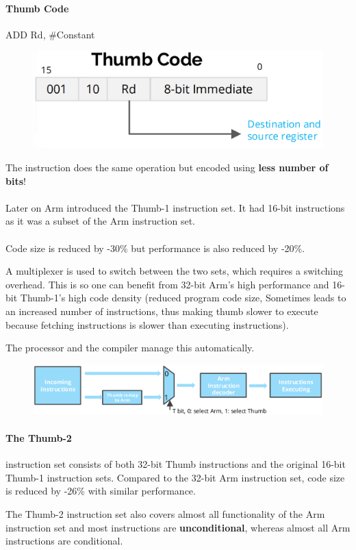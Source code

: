 \paragraph{Thumb Code} ADD Rd, \#Constant


\begin{figure}[H]
    \centering
    \includegraphics[width=0.6\linewidth]{img/image26.png}
\end{figure}

The instruction does the same operation but encoded using \textbf{less number of bits}!

\paragraph{}

Later on Arm introduced the Thumb-1 instruction set. It had 16-bit instructions as it was a subset of the
Arm instruction set.

\paragraph{}
Code size is reduced by -30\% but performance is also reduced by -20\%.

A multiplexer is used to switch between the two sets, which requires a switching overhead. This is so one
can benefit from 32-bit Arm's high performance and 16-bit Thumb-1's high code density (reduced program code size, Sometimes leads to an increased number of instructions, thus making thumb
slower to execute because fetching instructions is slower than executing instructions).

The processor
and the compiler manage this automatically.


\begin{figure}[H]
    \centering
    \includegraphics[width=0.8\linewidth]{img/image27.png}
\end{figure}

\paragraph{The Thumb-2} instruction set consists of both 32-bit Thumb instructions and the original 16-bit Thumb-1
instruction sets. Compared to the 32-bit Arm instruction set, code size is reduced by -26\% with similar
performance.

The Thumb-2 instruction set also covers almost all functionality of the Arm instruction set and most
instructions are \textbf{unconditional}, whereas almost all Arm instructions are conditional.